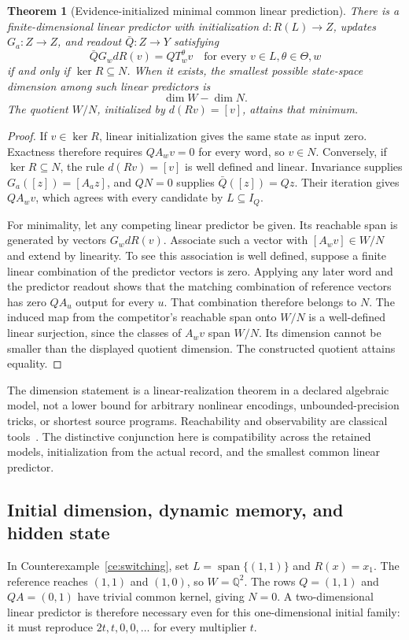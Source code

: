 \documentclass[11pt,letterpaper]{article}
\theoremstyle{plain}
\newtheorem{theorem}{Theorem}[section]
\theoremstyle{definition}
\newcommand{\Span}{\operatorname{span}}\newcommand{\Pow}{\mathcal P}
\begin{document}
\begin{theorem}[Evidence-initialized minimal common linear prediction]\label{thm:linearpredictor}
There is a finite-dimensional linear predictor with initialization $d:R(L)\to Z$, updates $G_a:Z\to Z$, and readout $\bar Q:Z\to Y$ satisfying
\[
\bar QG_wdR(v)=QT_w^\theta v
\quad\text{for every }v\in L,\theta\in\Theta,w
\]
if and only if $\ker R\subseteq N$. When it exists, the smallest possible state-space dimension among such \emph{linear} predictors is
\[
\dim W-\dim N.
\]
The quotient $W/N$, initialized by $d(Rv)=[v]$, attains that minimum.
\end{theorem}
\begin{proof}
If $v\in\ker R$, linear initialization gives the same state as input zero. Exactness therefore requires $QA_wv=0$ for every word, so $v\in N$. Conversely, if $\ker R\subseteq N$, the rule $d(Rv)=[v]$ is well defined and linear. Invariance supplies $G_a([z])=[A_az]$, and $QN=0$ supplies $\bar Q([z])=Qz$. Their iteration gives $QA_wv$, which agrees with every candidate by $L\subseteq I_Q$.

For minimality, let any competing linear predictor be given. Its reachable span is generated by vectors $G_wdR(v)$. Associate such a vector with $[A_wv]\in W/N$ and extend by linearity. To see this association is well defined, suppose a finite linear combination of the predictor vectors is zero. Applying any later word and the predictor readout shows that the matching combination of reference vectors has zero $QA_u$ output for every $u$. That combination therefore belongs to $N$. The induced map from the competitor's reachable span onto $W/N$ is a well-defined linear surjection, since the classes of $A_wv$ span $W/N$. Its dimension cannot be smaller than the displayed quotient dimension. The constructed quotient attains equality.
\end{proof}

The dimension statement is a linear-realization theorem in a declared algebraic model, not a lower bound for arbitrary nonlinear encodings, unbounded-precision tricks, or shortest source programs. Reachability and observability are classical tools~\cite{petreczky}. The distinctive conjunction here is compatibility across the retained models, initialization from the actual record, and the smallest common linear predictor.

\subsection{Initial dimension, dynamic memory, and hidden state}
In Counterexample~\ref{ce:switching}, set $L=\Span\{(1,1)\}$ and $R(x)=x_1$. The reference reaches $(1,1)$ and $(1,0)$, so $W=\mathbb Q^2$. The rows $Q=(1,1)$ and $QA=(0,1)$ have trivial common kernel, giving $N=0$. A two-dimensional linear predictor is therefore necessary even for this one-dimensional initial family: it must reproduce $2t,t,0,0,\ldots$ for every multiplier $t$.
\end{document}

